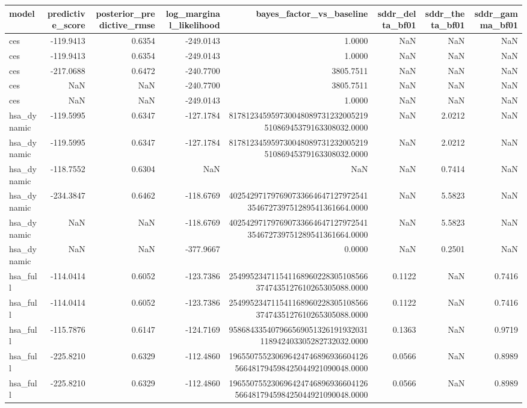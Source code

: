 \begin{tabular}{lrrrrrrr}
\toprule
model & predictive\_score & posterior\_predictive\_rmse & log\_marginal\_likelihood & bayes\_factor\_vs\_baseline & sddr\_delta\_bf01 & sddr\_theta\_bf01 & sddr\_gamma\_bf01 \\
\midrule
ces & -119.9413 & 0.6354 & -249.0143 & 1.0000 & NaN & NaN & NaN \\
ces & -119.9413 & 0.6354 & -249.0143 & 1.0000 & NaN & NaN & NaN \\
ces & -217.0688 & 0.6472 & -240.7700 & 3805.7511 & NaN & NaN & NaN \\
ces & NaN & NaN & -240.7700 & 3805.7511 & NaN & NaN & NaN \\
ces & NaN & NaN & -249.0143 & 1.0000 & NaN & NaN & NaN \\
hsa\_dynamic & -119.5995 & 0.6347 & -127.1784 & 81781234595973004808973123200521951086945379163308032.0000 & NaN & 2.0212 & NaN \\
hsa\_dynamic & -119.5995 & 0.6347 & -127.1784 & 81781234595973004808973123200521951086945379163308032.0000 & NaN & 2.0212 & NaN \\
hsa\_dynamic & -118.7552 & 0.6304 & NaN & NaN & NaN & 0.7414 & NaN \\
hsa\_dynamic & -234.3847 & 0.6462 & -118.6769 & 402542971797690733664647127972541354672739751289541361664.0000 & NaN & 5.5823 & NaN \\
hsa\_dynamic & NaN & NaN & -118.6769 & 402542971797690733664647127972541354672739751289541361664.0000 & NaN & 5.5823 & NaN \\
hsa\_dynamic & NaN & NaN & -377.9667 & 0.0000 & NaN & 0.2501 & NaN \\
hsa\_full & -114.0414 & 0.6052 & -123.7386 & 2549952347115411689602283051085663747435127610265305088.0000 & 0.1122 & NaN & 0.7416 \\
hsa\_full & -114.0414 & 0.6052 & -123.7386 & 2549952347115411689602283051085663747435127610265305088.0000 & 0.1122 & NaN & 0.7416 \\
hsa\_full & -115.7876 & 0.6147 & -124.7169 & 958684335407966569051326191932031118942403305282732032.0000 & 0.1363 & NaN & 0.9719 \\
hsa\_full & -225.8210 & 0.6329 & -112.4860 & 196550755230696424746896936604126566481794598425044921090048.0000 & 0.0566 & NaN & 0.8989 \\
hsa\_full & -225.8210 & 0.6329 & -112.4860 & 196550755230696424746896936604126566481794598425044921090048.0000 & 0.0566 & NaN & 0.8989 \\

\end{tabular}
